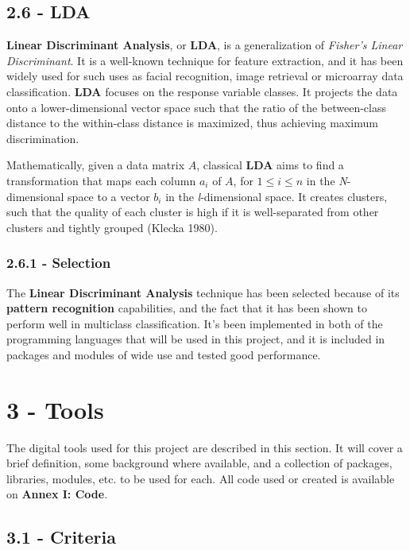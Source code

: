 \documentclass[]{article}
\begin{document}
\subsection{2.6 - LDA}\label{lda}

\textbf{Linear Discriminant Analysis}, or \textbf{LDA}, is a
generalization of \emph{Fisher's Linear Discriminant}. It is a
well-known technique for feature extraction, and it has been widely used
for such uses as facial recognition, image retrieval or microarray data
classification. \textbf{LDA} focuses on the response variable classes.
It projects the data onto a lower-dimensional vector space such that the
ratio of the between-class distance to the within-class distance is
maximized, thus achieving maximum discrimination.

Mathematically, given a data matrix \(A\), classical \textbf{LDA} aims
to find a transformation that maps each column \(a_i\) of \(A\), for
\(1 \leq i \leq n\) in the \emph{N}-dimensional space to a vector
\(b_i\) in the \emph{l}-dimensional space. It creates clusters, such
that the quality of each cluster is high if it is well-separated from
other clusters and tightly grouped (Klecka 1980).

\subsubsection{2.6.1 - Selection}\label{selection-4}

The \textbf{Linear Discriminant Analysis} technique has been selected
because of its \textbf{pattern recognition} capabilities, and the fact
that it has been shown to perform well in multiclass classification.
It's been implemented in both of the programming languages that will be
used in this project, and it is included in packages and modules of wide
use and tested good performance.

\section{3 - Tools}\label{tools}

The digital tools used for this project are described in this section.
It will cover a brief definition, some background where available, and a
collection of packages, libraries, modules, etc. to be used for each.
All code used or created is available on \textbf{Annex I: Code}.

\subsection{3.1 - Criteria}\label{criteria}
\end{document}
